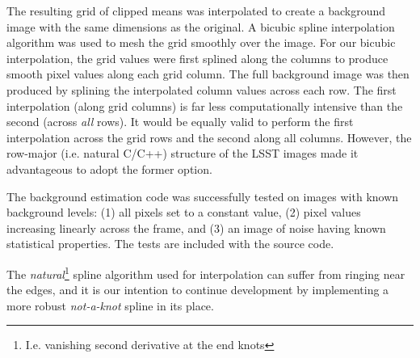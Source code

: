 The resulting grid of clipped means was interpolated to create a
background image with the same dimensions as the original.  A bicubic
spline interpolation algorithm was used to mesh the grid smoothly over
the image.  For our bicubic interpolation, the
grid values were first splined along the columns to produce smooth
pixel values along each grid column.  The full background image was
then produced by splining the interpolated column values across each
row.  The first interpolation (along grid columns) is far less
computationally intensive than the second (across {\itshape all}
rows).  It would be equally valid to perform the first interpolation
across the grid rows and the second along all columns.  However, the
row-major (i.e. natural C/C++) structure of the LSST images made it advantageous to adopt
the former option.


The background estimation code was successfully tested on images with
known background levels: (1) all pixels set to a constant value, (2)
pixel values increasing linearly across the frame, and (3) an image of
noise having known statistical properties.  The tests are included
with the source code.


The {\itshape natural}\footnote{I.e. vanishing second derivative at the end knots}
spline algorithm used for interpolation can
suffer from ringing near the edges, and it is our intention to
continue development by implementing a more robust {\itshape
not-a-knot} spline in its place.
